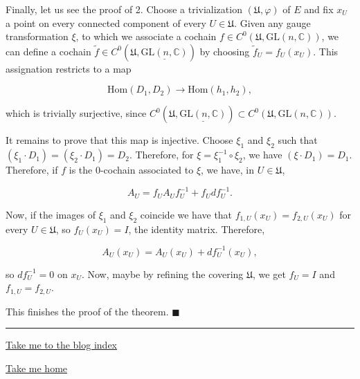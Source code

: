 \documentclass[]{article}
\begin{document}
Finally, let us see the proof of 2. Choose a trivialization
\((\mathfrak{U},\varphi)\) of \(E\) and fix \(x_U\) a point on every
connected component of every \(U\in \mathfrak{U}\). Given any gauge
transformation \(\xi\), to which we associate a cochain
\(f\in C^0(\mathfrak{U},\mathrm{GL}(n,\mathbb{C}))\), we can define a
cochain
\(\tilde{f} \in C^0(\mathfrak{U},\underline{\mathrm{GL}(n,\mathbb{C})})\)
by choosing \(\tilde{f}_U = f_U(x_U)\). This assignation restricts to a
map

\[
\mathrm{Hom}(D_1,D_2) \rightarrow \mathrm{Hom}(h_1,h_2),
\]

which is trivially surjective, since
\(C^0(\mathfrak{U},\underline{\mathrm{GL}(n,\mathbb{C})}) \subset C^0(\mathfrak{U},\mathrm{GL}(n,\mathbb{C}))\).

It remains to prove that this map is injective. Choose \(\xi_1\) and
\(\xi_2\) such that \((\xi_1 \cdot D_1) = (\xi_2 \cdot D_1) = D_2\).
Therefore, for \(\xi=\xi_1^{-1} \circ \xi_2\), we have
\((\xi \cdot D_1) = D_1\). Therefore, if \(f\) is the \(0\)-cochain
associated to \(\xi\), we have, in \(U\in \mathfrak{U}\),

\[
A_U = f_U A_U f_U^{-1} + f_U df_U^{-1}.
\]

Now, if the images of \(\xi_1\) and \(\xi_2\) coincide we have that
\(f_{1,U}(x_U) = f_{2,U}(x_U)\) for every \(U\in \mathfrak{U}\), so
\(f_U(x_U) = I\), the identity matrix. Therefore,

\[
A_U (x_U ) = A_U(x_U) + df_U^{-1} (x_U),
\]

so \(df_U^{-1}=0\) on \(x_U\). Now, maybe by refining the covering
\(\mathfrak{U}\), we get \(f_U = I\) and \(f_{1,U} = f_{2,U}\).

This finishes the proof of the theorem. \(\blacksquare\)

\begin{center}\rule{0.5\linewidth}{\linethickness}\end{center}

\href{https://guillegran.github.io/blog/indice.html}{Take me to the blog
index}

\href{https://guillegran.github.io}{Take me home}
\end{document}
